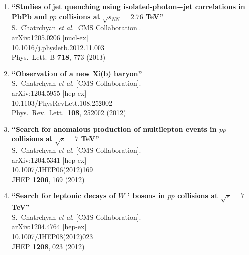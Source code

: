 \documentclass{article}
\begin{document}
\begin{enumerate}
\item%
{\bf ``Studies of jet quenching using isolated-photon+jet correlations in PbPb and $pp$ collisions at $\sqrt{s_{NN}}=2.76$ TeV''}
  \\{}S.~Chatrchyan {\it et al.}  [CMS Collaboration].
  \\{}arXiv:1205.0206 [nucl-ex]
    \\{}10.1016/j.physletb.2012.11.003
\\{}Phys.\ Lett.\ B {\bf 718}, 773 (2013) %


\item%
{\bf ``Observation of a new Xi(b) baryon''}
  \\{}S.~Chatrchyan {\it et al.}  [CMS Collaboration].
  \\{}arXiv:1204.5955 [hep-ex]
    \\{}10.1103/PhysRevLett.108.252002
\\{}Phys.\ Rev.\ Lett.\  {\bf 108}, 252002 (2012) %


\item%
{\bf ``Search for anomalous production of multilepton events in $pp$ collisions at $\sqrt{s}=7$ TeV''}
  \\{}S.~Chatrchyan {\it et al.}  [CMS Collaboration].
  \\{}arXiv:1204.5341 [hep-ex]
    \\{}10.1007/JHEP06(2012)169
\\{}JHEP {\bf 1206}, 169 (2012) %


\item%
{\bf ``Search for leptonic decays of $W$ ' bosons in $pp$ collisions at $\sqrt{s}=7$ TeV''}
  \\{}S.~Chatrchyan {\it et al.}  [CMS Collaboration].
  \\{}arXiv:1204.4764 [hep-ex]
    \\{}10.1007/JHEP08(2012)023
\\{}JHEP {\bf 1208}, 023 (2012) %



\end{enumerate}
\end{document}
